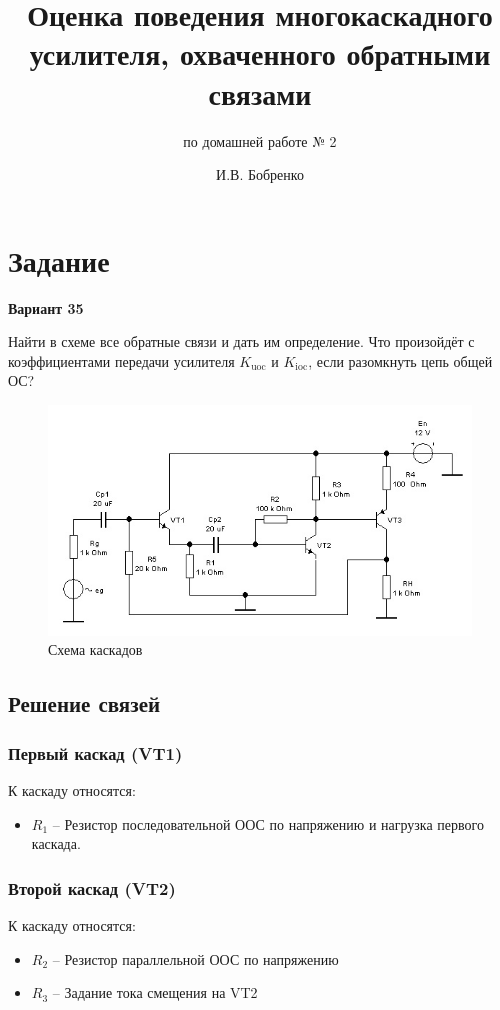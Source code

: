 \documentclass{labreport}
\title{Оценка поведения многокаскадного усилителя, охваченного обратными связами}
\subtitle{по домашней работе № 2}
\author{И.В. Бобренко}
\begin{document}
\maketitle


\chapter{Задание}

\textbf{Вариант 35}

Найти в схеме все обратные связи и дать им определение. Что произойдёт с коэффициентами передачи усилителя $K_\text{uoc}$ и $K_\text{ioc}$, если разомкнуть цепь общей ОС?

\begin{figure}[h]
    \centering
    \includegraphics[width=\linewidth]{ek_task2.jpg}
    \caption{Схема каскадов}
    \label{fig:my_label}
\end{figure}

\section{Решение связей}
\subsection{Первый каскад (VT1)}
К каскаду относятся:
\begin{itemize}
    \item $R_1$ -- Резистор последовательной ООС по напряжению и нагрузка первого каскада.
\end{itemize}


\subsection{Второй каскад (VT2)}
К каскаду относятся:
\begin{itemize}
    \item $R_2$ -- Резистор параллельной ООС по напряжению
    \item $R_3$ -- Задание тока смещения на VT2
\end{itemize}
\end{document}

